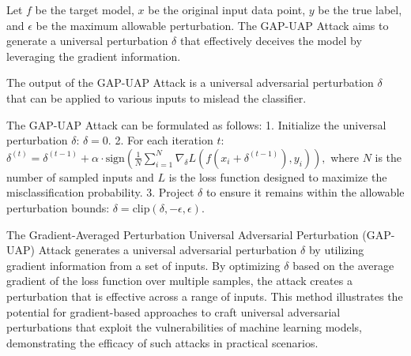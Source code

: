 Let \( f \) be the target model, \( x \) be the original input data point, \( y \) be the true label, and \( \epsilon \) be the maximum allowable perturbation. The GAP-UAP Attack aims to generate a universal perturbation \( \delta \) that effectively deceives the model by leveraging the gradient information.

The output of the GAP-UAP Attack is a universal adversarial perturbation \( \delta \) that can be applied to various inputs to mislead the classifier.

The GAP-UAP Attack can be formulated as follows:
1. Initialize the universal perturbation \( \delta \):
   $
   \delta = 0.
   $
2. For each iteration \( t \):
   $
   \delta^{(t)} = \delta^{(t-1)} + \alpha \cdot \text{sign} \left( \frac{1}{N} \sum_{i=1}^N \nabla_{\delta} L(f(x_i + \delta^{(t-1)}), y_i) \right),
   $
   where \( N \) is the number of sampled inputs and \( L \) is the loss function designed to maximize the misclassification probability.
3. Project \( \delta \) to ensure it remains within the allowable perturbation bounds:
   $
   \delta = \text{clip}(\delta, -\epsilon, \epsilon).
   $

The Gradient-Averaged Perturbation Universal Adversarial Perturbation (GAP-UAP) Attack generates a universal adversarial perturbation \( \delta \) by utilizing gradient information from a set of inputs. By optimizing \( \delta \) based on the average gradient of the loss function over multiple samples, the attack creates a perturbation that is effective across a range of inputs. This method illustrates the potential for gradient-based approaches to craft universal adversarial perturbations that exploit the vulnerabilities of machine learning models, demonstrating the efficacy of such attacks in practical scenarios.
